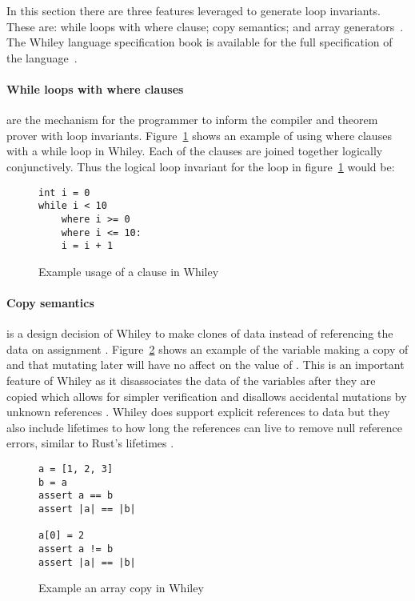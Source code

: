 In this section there are three features leveraged to generate loop invariants.
These are: while loops with where clause; copy semantics;
and array generators~\cite{whiley-design}.
The Whiley language specification book is available for the full
specification of the language~\cite{whiley-spec}.

\paragraph{While loops with where clauses} are the mechanism for the programmer
to inform the compiler and theorem prover with loop invariants.
Figure~\ref{lst:whiley-where} shows an example of using where clauses with a
while loop in Whiley.
Each of the  clauses are joined together logically conjunctively.
Thus the logical loop invariant for the loop in figure~\ref{lst:whiley-where} would be:

\begin{figure}[ht]
\begin{lstlisting}
int i = 0
while i < 10
    where i >= 0
    where i <= 10:
    i = i + 1
\end{lstlisting}
    \caption{Example usage of a  clause in Whiley}
    \label{lst:whiley-where}
\end{figure}

\paragraph{Copy semantics} is a design decision of Whiley to
make clones of data instead of referencing the data on assignment \cite{whiley-arrays}.
Figure~\ref{lst:whiley-array-copy} shows an example of the variable
 making a copy of  and that mutating  later
will have no affect on the value of .
This is an important feature of Whiley as it disassociates the data
of the variables after they are copied which allows for simpler verification
and disallows accidental mutations by unknown references \cite{whiley-arrays}.
Whiley does support explicit references to data but they also include
lifetimes to how long the references can live to remove null reference errors,
similar to Rust's lifetimes \cite{rust-lang}.

\begin{figure}[ht]
\begin{lstlisting}
a = [1, 2, 3]
b = a
assert a == b
assert |a| == |b|

a[0] = 2
assert a != b
assert |a| == |b|
\end{lstlisting}
    \caption{Example an array copy in Whiley}
    \label{lst:whiley-array-copy}
\end{figure}

